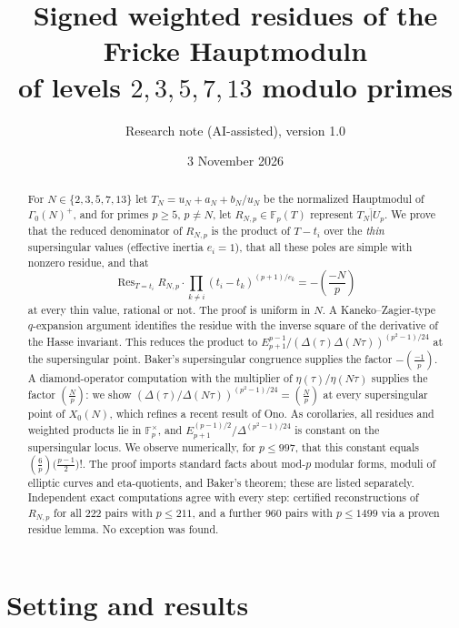 \documentclass[11pt,a4paper]{article}
\title{Signed weighted residues of the Fricke Hauptmoduln\\
of levels $2,3,5,7,13$ modulo primes}
\author{Research note (AI-assisted), version 1.0}
\date{3 November 2026}
\numberwithin{equation}{section}
\theoremstyle{definition}
\theoremstyle{remark}
\newcommand{\Fp}{\mathbb F_p}
\newcommand{\Res}{\operatorname{Res}}
\newcommand{\Lp}[1]{\left(\frac{#1}{p}\right)}
\begin{document}
\maketitle

\begin{abstract}
For $N\in\{2,3,5,7,13\}$ let $T_N=u_N+a_N+b_N/u_N$ be the normalized Hauptmodul of
$\Gamma_0(N)^+$, and for primes $p\ge5$, $p\ne N$, let $R_{N,p}\in\Fp(T)$ represent
$\overline{T_N|U_p}$. We prove that the reduced denominator of $R_{N,p}$ is the product of
$T-t_i$ over the \emph{thin} supersingular values (effective inertia $e_i=1$), that all
these poles are simple with nonzero residue, and that
\[
\Res_{T=t_i}R_{N,p}\cdot\prod_{k\ne i}(t_i-t_k)^{(p+1)/e_k}=-\Lp{-N}
\]
at every thin value, rational or not. The proof is uniform in $N$. A Kaneko--Zagier-type
$q$-expansion argument identifies the residue with the inverse square of the derivative of
the Hasse invariant. This reduces the product to $E_{p+1}^{p-1}/(\Delta(\tau)\Delta(N\tau))^{(p^2-1)/24}$
at the supersingular point. Baker's supersingular congruence supplies the factor
$-\left(\frac{-1}{p}\right)$. A diamond-operator computation with the multiplier of
$\eta(\tau)/\eta(N\tau)$ supplies the factor $\left(\frac{N}{p}\right)$: we show
$(\Delta(\tau)/\Delta(N\tau))^{(p^2-1)/24}=\left(\frac{N}{p}\right)$ at every supersingular
point of $X_0(N)$, which refines a recent result of Ono. As corollaries, all residues and
weighted products lie in $\Fp^\times$, and
$E_{p+1}^{(p-1)/2}/\Delta^{(p^2-1)/24}$ is constant on the supersingular locus. We observe
numerically, for $p\le997$, that this constant equals $\left(\frac{6}{p}\right)\bigl(\frac{p-1}{2}\bigr)!$.
The proof imports standard facts about mod-$p$ modular forms, moduli of elliptic curves and
eta-quotients, and Baker's theorem; these are listed separately. Independent exact
computations agree with every step: certified reconstructions of $R_{N,p}$ for all
222 pairs with $p\le 211$, and a further 960 pairs with $p\le 1499$ via a proven
residue lemma. No exception was found.
\end{abstract}

\tableofcontents

\section{Setting and results}\label{sec:intro}
\end{document}
